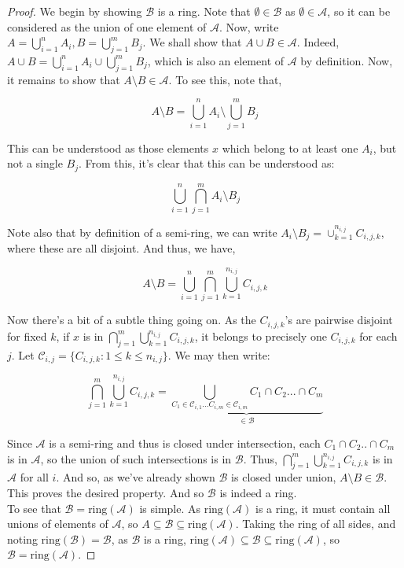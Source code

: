 \begin{proof}
   We begin by showing $\mathcal B$ is a ring. Note that $\emptyset \in \mathcal B$ as $\emptyset \in \mathcal A$, so it can be considered 
   as the union of one element of $\mathcal A$. Now, write $A = \bigcup_{i=1}^n A_i, B = \bigcup_{j=1}^m B_j$. 
   We shall show that $A \cup B \in \mathcal A$. Indeed, $A \cup B = \bigcup_{i =1}^n A_i \cup \bigcup_{j=1}^m B_j$, which 
   is also an element of $\mathcal A$ by definition. Now, it remains to show that 
   $A \setminus B \in \mathcal A$. To see this, note that, 

   \[ A \setminus B = \bigcup_{i=1}^n A_i \setminus \bigcup_{j=1}^m B_j \]

   This can be understood as those elements $x$ which belong to at least one $A_i$, but 
   not a single $B_j$. From this, it's clear that this can be understood as: 

   \[ \bigcup_{i=1}^n \bigcap_{j=1}^m A_i \setminus B_j \] 

   Note also that by definition of a semi-ring, we can write $A_i \setminus B_j = 
   \cup_{k=1}^{n_{i,j}}C_{i,j,k}$, where these are all disjoint. And thus, we have, 

   \[  A \setminus B = \bigcup_{i=1}^n \bigcap_{j=1}^m \bigcup_{k=1}^{n_{i,j}} C_{i,j,k} \]

   Now there's a bit of a subtle thing going on. As the $C_{i,j,k}$'s are pairwise 
   disjoint for fixed $k$, if $x$ is in $\bigcap_{j=1}^m \bigcup_{k=1}^{n_{i,j}} C_{i,j,k}$, it 
   belongs to precisely one $C_{i,j,k}$ for each $j$. Let $\mathcal C_{i,j} = \{C_{i,j,k} : 1 \leq k \leq n_{i,j}\}$. 
   We may then write: 

   \[ \bigcap_{j=1}^m \bigcup_{k=1}^{n_{i,j}} C_{i,j,k} = \underbrace{\bigcup_{C_{1} \in \mathcal C_{i,1} ... C_{i,m} \in \mathcal C_{i,m} } C_1 \cap C_2... \cap C_m}_{ \in \mathcal B}  \]

   Since $\mathcal A$ is a semi-ring and thus is closed under intersection, 
   each $C_1 \cap C_2.. \cap C_m$ is in $\mathcal A$, so the union of such intersections is 
   in $\mathcal B$. Thus, 
   $\bigcap_{j=1}^m \bigcup_{k=1}^{n_{i,j}} C_{i,j,k}$ is in $\mathcal A$ for all $i$. 
   And so, as we've already shown $\mathcal B$ is closed under union, $A \setminus B \in \mathcal B$. 
   This proves the desired property. And so $\mathcal B$ is indeed a ring. \\ 

   To see that $\mathcal B = \text{ring}(\mathcal A)$ is simple. As $\text{ring}(\mathcal A)$ is a ring, 
   it must contain all unions of elements of $\mathcal A$, so $A \subseteq \mathcal B \subseteq \text{ring}(\mathcal A)$. 
   Taking the ring of all sides, and noting $\text{ring}(\mathcal B) = \mathcal B$, as $\mathcal B$ is a ring, 
   $\text{ring}(\mathcal A) \subseteq \mathcal B \subseteq \text{ring}(\mathcal A)$, so 
   $\mathcal B =\text{ring}(\mathcal A)$.

\end{proof}

